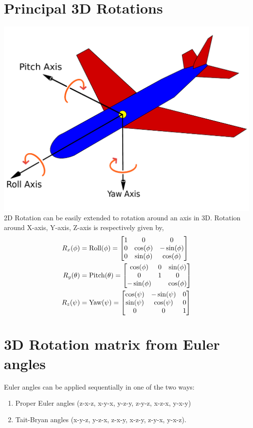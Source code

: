 \documentclass[twocolumn]{article}
\begin{document}
\section{Principal 3D  Rotations}
\includegraphics[width=\linewidth]{media/euler-angles.pdf}
2D Rotation can be  easily extended to rotation around an axis  in 3D.  Rotation
around  X-axis, Y-axis, Z-axis   is respectively given  by,
\begin{align}
  R_x(\phi) &= \text{Roll}(\phi)  = \begin{bmatrix}
    1  &  0 &  0 \\
    0  &  \cos(\phi)  &  -  \sin(\phi) \\
    0  &  \sin(\phi)  &  \cos(\phi)
    \end{bmatrix}
  \notag\\
  R_y(\theta) & = \text{Pitch}(\theta)  = \begin{bmatrix}
    \cos(\phi)  &  0 &  \sin(\phi) \\
    0  &  1 &  0 \\
    -\sin(\phi)  &   & \cos(\phi)
  \end{bmatrix}
\notag\\
  R_z(\psi) & = \text{Yaw}(\psi)  = \begin{bmatrix}
    \cos(\psi)  &  -  \sin(\psi)  & 0    \\
    \sin(\psi)  &  \cos(\psi)  &  0   \\
    0 &  0     &   1
  \end{bmatrix}
\end{align}
\section{3D  Rotation matrix   from Euler  angles}
Euler  angles   can be applied sequentially  in  one  of the two ways:
\begin{enumerate}
  \item Proper Euler angles (z-x-z, x-y-x, y-z-y, z-y-z, x-z-x, y-x-y)
  \item Tait-Bryan angles   (x-y-z, y-z-x, z-x-y, x-z-y, z-y-x, y-x-z).
  \end{enumerate}
  
\end{document}

